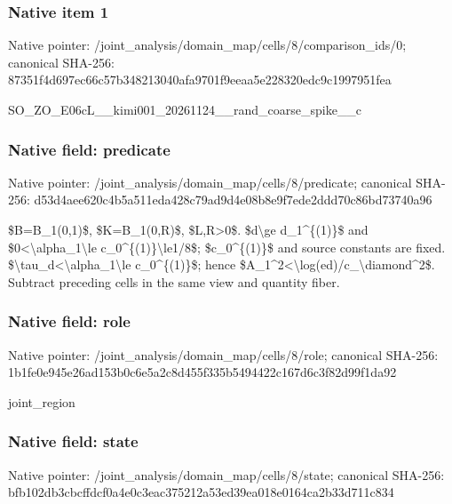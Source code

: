 \documentclass[10pt,a4paper]{article}
\begin{document}
\subsubsection{Native item 1}


Native pointer: /joint\_analysis/domain\_m\allowbreak{}ap/cells/8/comparison\_id\allowbreak{}s/0; canonical SHA-256: 87351f4d697ec66c57b34821\allowbreak{}3040afa9701f9eeaa5e22832\allowbreak{}0edc9c1997951fea


SO\_ZO\_E06cL\_\_kimi001\_202\allowbreak{}61124\_\_rand\_coarse\_spike\allowbreak{}\_\_c


\subsubsection{Native field: predicate}


Native pointer: /joint\_analysis/domain\_m\allowbreak{}ap/cells/8/predicate; canonical SHA-256: d53d4aee620c4b5a511eda42\allowbreak{}8c79ad9d4e08b8e9f7ede2dd\allowbreak{}d70c86bd73740a96


\$B=B\_1(0,1)\$, \$K=B\_1(0,R)\$, \$L,R>0\$. \$d\textbackslash{}ge d\_1\textasciicircum{}\{(1)\}\$ and \$0<\textbackslash{}alpha\_1\textbackslash{}le c\_0\textasciicircum{}\{(1)\}\textbackslash{}le1/8\$; \$c\_0\textasciicircum{}\{(1)\}\$ and source constants are fixed. \$\textbackslash{}tau\_d<\textbackslash{}alpha\_1\textbackslash{}le c\_0\textasciicircum{}\{(1)\}\$; hence \$A\_1\textasciicircum{}2<\textbackslash{}log(ed)/c\_\textbackslash{}diamond\textasciicircum{}2\$. Subtract preceding cells in the same view and quantity fiber.


\subsubsection{Native field: role}


Native pointer: /joint\_analysis/domain\_map/cells/8/role; canonical SHA-256: 1b1fe0e945e26ad153b0c6e5\allowbreak{}a2c8d455f335b5494422c167\allowbreak{}d6c3f82d99f1da92


joint\_region


\subsubsection{Native field: state}


Native pointer: /joint\_analysis/domain\_m\allowbreak{}ap/cells/8/state; canonical SHA-256: bfb102db3cbcffdcf0a4e0c3\allowbreak{}eac375212a53ed39ea018e01\allowbreak{}64ca2b33d711c834
\end{document}
